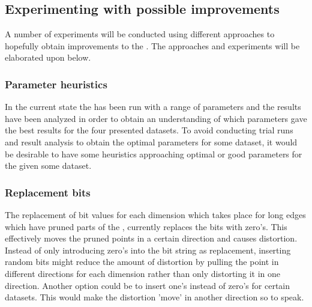 \subsection{Experimenting with possible improvements}
A number of experiments will be conducted using different approaches to hopefully obtain improvements to the \qs{}. The approaches and experiments will be elaborated upon below.

\subsubsection{Parameter heuristics}
In the current state the \qs{} has been run with a range of parameters and the results have been analyzed in order to obtain an understanding of which parameters gave the best results for the four presented datasets. To avoid conducting trial runs and result analysis to obtain the optimal parameters for some dataset, it would be desirable to have some heuristics approaching optimal or good parameters for the \qs{} given some dataset.

\subsubsection{Replacement bits}
The replacement of bit values for each dimension which takes place for long edges which have pruned parts of the \qt{}, currently replaces the bits with zero's. This effectively moves the pruned points in a certain direction and causes distortion. Instead of only introducing zero's into the bit string as replacement, inserting random bits might reduce the amount of distortion by pulling the point in different directions for each dimension rather than only distorting it in one direction. Another option could be to insert one's instead of zero's for certain datasets. This would make the distortion 'move' in another direction so to speak.

